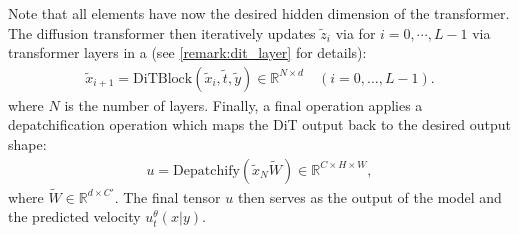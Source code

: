 Note that all elements have now the desired hidden dimension of the transformer. The diffusion transformer then iteratively updates $\tilde{z}_i$ via for $i=0,\cdots,L-1$ via transformer layers in a  (see  \cref{remark:dit_layer} for details):
\begin{align}
\tilde{x}_{i+1}=\text{DiTBlock}(\tilde{x}_i,\tilde{t},\tilde{y})\in\mathbb{R}^{N\times d}\quad (i=0,\dots,L-1).
\end{align}
where $N$ is the number of layers.
Finally, a final operation applies a depatchification operation which maps the DiT output back to the desired output shape:
\begin{align*}
u=\text{Depatchify}(\tilde{x}_N\tilde{W})\in \mathbb{R}^{C\times H\times W},
\end{align*}
where $\tilde{W}\in \mathbb{R}^{d\times C'}$. The final tensor $u$ then serves as the output of the model and the predicted velocity $u_t^\theta(x|y)$.
